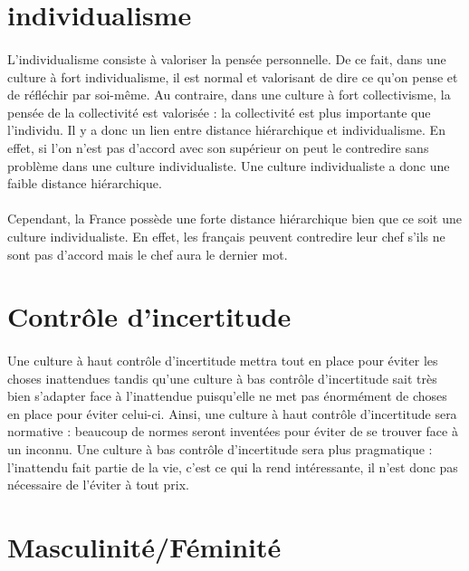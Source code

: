 \section{individualisme}
\paragraph{}
L’individualisme consiste à valoriser la pensée personnelle. De ce fait, dans une culture à fort individualisme, il est normal et valorisant de dire ce qu’on pense et de réfléchir par soi-même. Au contraire, dans une culture à fort collectivisme, la pensée de la collectivité est valorisée : la collectivité est plus importante que l’individu. Il y a donc un lien entre distance hiérarchique et individualisme. En effet, si l’on n’est pas d’accord avec son supérieur on peut le contredire sans problème dans une culture individualiste. Une culture individualiste a donc une faible distance hiérarchique.
\paragraph{}
Cependant, la France possède une forte distance hiérarchique bien que ce soit une culture individualiste. En effet, les français peuvent contredire leur chef s’ils ne sont pas d’accord mais le chef aura le dernier mot. 

\section{Contrôle d'incertitude}
\paragraph{}
Une culture à haut contrôle d’incertitude mettra tout en place pour éviter les choses inattendues tandis qu’une culture à bas contrôle d’incertitude sait très bien s’adapter face à l’inattendue puisqu’elle ne met pas énormément de choses en place pour éviter celui-ci.  Ainsi, une culture à haut contrôle d’incertitude sera normative : beaucoup de normes seront inventées pour éviter de se trouver face à un inconnu. Une culture à bas contrôle d’incertitude sera plus pragmatique : l’inattendu fait partie de la vie, c’est ce qui la rend intéressante, il n’est donc pas nécessaire de l’éviter à tout prix. 

\section{Masculinité/Féminité}
